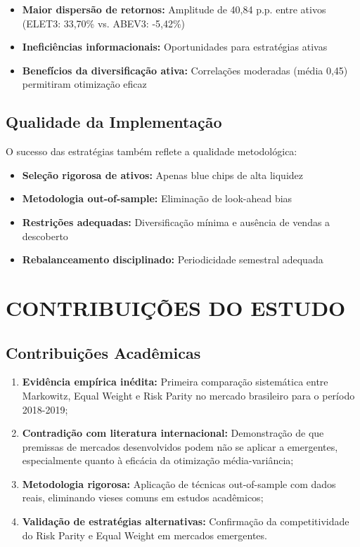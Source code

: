 \begin{itemize}
    \item \textbf{Maior dispersão de retornos:} Amplitude de 40,84 p.p. entre ativos (ELET3: 33,70\% vs. ABEV3: -5,42\%)
    \item \textbf{Ineficiências informacionais:} Oportunidades para estratégias ativas
    \item \textbf{Benefícios da diversificação ativa:} Correlações moderadas (média 0,45) permitiram otimização eficaz
\end{itemize}

\subsection{Qualidade da Implementação}

O sucesso das estratégias também reflete a qualidade metodológica:

\begin{itemize}
    \item \textbf{Seleção rigorosa de ativos:} Apenas blue chips de alta liquidez
    \item \textbf{Metodologia out-of-sample:} Eliminação de look-ahead bias
    \item \textbf{Restrições adequadas:} Diversificação mínima e ausência de vendas a descoberto
    \item \textbf{Rebalanceamento disciplinado:} Periodicidade semestral adequada
\end{itemize}

\section{CONTRIBUIÇÕES DO ESTUDO}

\subsection{Contribuições Acadêmicas}

\begin{enumerate}
    \item \textbf{Evidência empírica inédita:} Primeira comparação sistemática entre Markowitz, Equal Weight e Risk Parity no mercado brasileiro para o período 2018-2019;
    
    \item \textbf{Contradição com literatura internacional:} Demonstração de que premissas de mercados desenvolvidos podem não se aplicar a emergentes, especialmente quanto à eficácia da otimização média-variância;
    
    \item \textbf{Metodologia rigorosa:} Aplicação de técnicas out-of-sample com dados reais, eliminando vieses comuns em estudos acadêmicos;
    
    \item \textbf{Validação de estratégias alternativas:} Confirmação da competitividade do Risk Parity e Equal Weight em mercados emergentes.
\end{enumerate}

